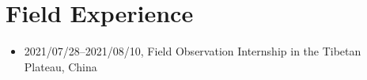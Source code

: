 \section{Field Experience}

\begin{itemize}
\item 2021/07/28--2021/08/10, Field Observation Internship in the Tibetan Plateau, China
\end{itemize}
